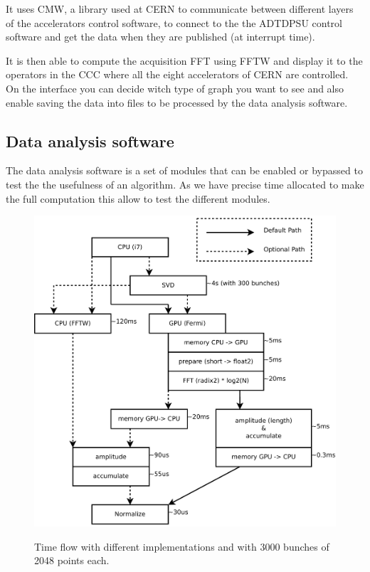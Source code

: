 	It uses \gls{CMW}, a library used at \gls{CERN} to communicate between different layers of the accelerators control software, to connect to the the ADTDPSU control software and get the data when they are published (at interrupt time).

	It is then able to compute the acquisition \gls{FFT} using \gls{FFTW} and display it to the operators in the \gls{CCC} where all the eight accelerators of \gls{CERN} are controlled. On the interface you can decide witch type of graph you want to see and also enable saving the data into files to be processed by the data analysis software.

	\subsection{Data analysis software}

	The data analysis software is a set of modules that can be enabled or bypassed to test the the usefulness of an algorithm. As we have precise time allocated to make the full computation this allow to test the different modules.

	\begin{figure}[H]
	\caption{Time flow with different implementations and with 3000 bunches of 
	2048 points each.}
	\centering
	\includegraphics[scale=0.3]{PC-flow.pdf}
	\label{fig:PCFlow}
	\end{figure}

